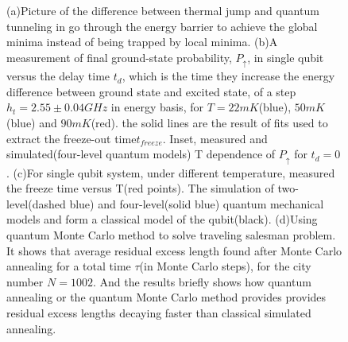 \documentclass{turabian-researchpaper}
\begin{document}
\begin{figure}
{        }
        \caption{(a)Picture of the difference between thermal jump and quantum tunneling in go through the energy barrier to achieve the global minima instead of being trapped by local minima\cite{das2008colloquium}. (b)A measurement of final ground-state probability, $P_{\uparrow}$, in single qubit versus the delay time $t_d$, which is the time they increase the energy difference between ground state and excited state, of a step $h_t = 2.55\pm 0.04GHz$ in energy basis, for $T=22mK$(blue), $50mK$(blue) and $90mK$(red). the solid lines are the result of fits used to extract the freeze-out time$t_{freeze}$. Inset, measured and simulated(four-level quantum models) T dependence of $P_\uparrow$ for $t_d = 0$\cite{johnson2011quantum}. (c)For single qubit system, under different temperature, measured the freeze time versus T(red points). The simulation of two-level(dashed blue) and four-level(solid blue) quantum mechanical models and form a classical model of the qubit(black)\cite{johnson2011quantum}. (d)Using quantum Monte Carlo method to solve traveling salesman problem. It shows that average residual excess length found after Monte Carlo annealing for a total time $\tau$(in Monte Carlo steps), for the city number $N=1002$. And the results briefly shows how quantum annealing or the quantum Monte Carlo method provides provides residual excess lengths decaying faster than classical simulated annealing\cite{martovnak2004quantum}.} 
    \end{figure}
\end{document}
